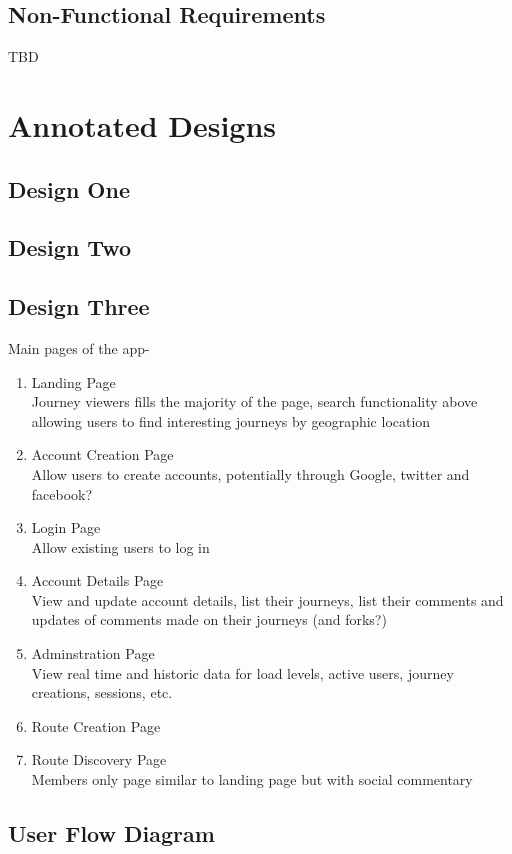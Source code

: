 \documentclass[a4paper,twoside,notitlepage,11pt]{article}
\begin{document}
 
 \subsection{Non-Functional Requirements}
 TBD
 
 
 \section{Annotated Designs}
 \subsection{Design One}
  \subsection{Design Two}
   \subsection{Design Three}
 
{ \color{red}
 Main pages of the app-
 \begin{enumerate}
  \item Landing Page\\
  Journey viewers fills the majority of the page, search functionality above allowing users to find interesting journeys by geographic location
  \item Account Creation Page\\
  Allow users to create accounts, potentially through Google, twitter and facebook?
  \item Login Page\\
  Allow existing users to log in
  \item Account Details Page\\
  View and update account details, list their journeys, list their comments and updates of comments made on their journeys (and forks?)
  \item Adminstration Page\\
  View real time and historic data for load levels, active users, journey creations, sessions, etc.
 \item Route Creation Page
 \item Route Discovery Page\\
 Members only page similar to landing page but with social commentary
 \end{enumerate}
 

 }
 \subsection{User Flow Diagram}
 
\end{document}

